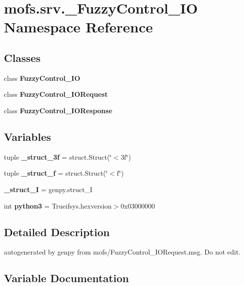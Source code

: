 \section{mofs.\-srv.\-\_\-\-Fuzzy\-Control\-\_\-\-I\-O Namespace Reference}
\label{namespacemofs_1_1srv_1_1__FuzzyControl__IO}
\subsection*{Classes}
\begin{DoxyCompactItemize}
\item 
class {\bf Fuzzy\-Control\-\_\-\-I\-O}
\item 
class {\bf Fuzzy\-Control\-\_\-\-I\-O\-Request}
\item 
class {\bf Fuzzy\-Control\-\_\-\-I\-O\-Response}
\end{DoxyCompactItemize}
\subsection*{Variables}
\begin{DoxyCompactItemize}
\item 
tuple {\bf \-\_\-struct\-\_\-3f} = struct.\-Struct(\char`\"{}$<$3f\char`\"{})
\item 
tuple {\bf \-\_\-struct\-\_\-f} = struct.\-Struct(\char`\"{}$<$f\char`\"{})
\item 
{\bf \-\_\-struct\-\_\-\-I} = genpy.\-struct\-\_\-\-I
\item 
int {\bf python3} = Trueifsys.\-hexversion$>$0x03000000
\end{DoxyCompactItemize}


\subsection{Detailed Description}
\begin{DoxyVerb}autogenerated by genpy from mofs/FuzzyControl_IORequest.msg. Do not edit.\end{DoxyVerb}
 

\subsection{Variable Documentation}
